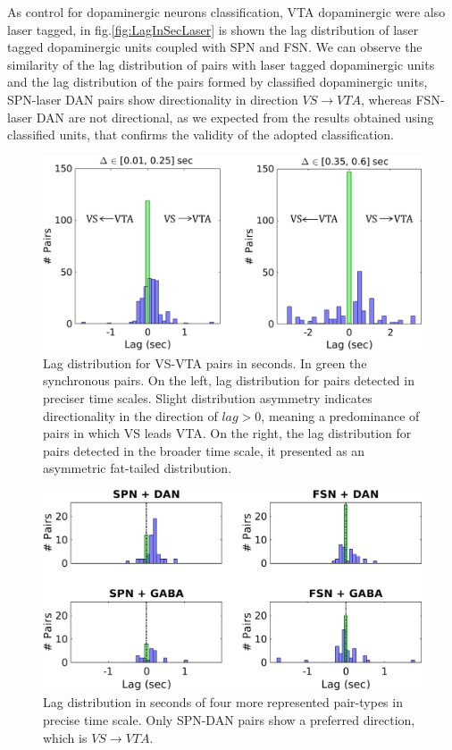 As control for dopaminergic neurons classification, VTA dopaminergic were also laser tagged, in fig.\ref{fig:LagInSecLaser} is shown the lag distribution of laser tagged dopaminergic units coupled with SPN and FSN. We can observe the similarity of the lag distribution of pairs with laser tagged dopaminergic units and the lag distribution of the pairs formed by classified dopaminergic units, SPN-laser DAN pairs show directionality in direction $VS\rightarrow VTA$, whereas FSN-laser DAN are not directional, as we expected from the results obtained using classified units, that confirms the validity of the adopted classification.\\
\begin{figure}[H]
\centering
\includegraphics[scale=0.65]{figures/LagGeneral1.pdf}
\caption{Lag distribution for VS-VTA pairs in seconds. In green the synchronous pairs. On the left, lag distribution for pairs detected in preciser time scales. Slight distribution asymmetry indicates directionality in the direction of $lag > 0$, meaning a predominance of pairs in which VS leads VTA. On the right, the lag distribution for pairs detected in the broader time scale, it presented as an asymmetric fat-tailed distribution.}
\label{fig:LagInSecAll}
\end{figure}
\begin{figure}[H]
\centering
\includegraphics[scale=0.5]{figures/LagSec4Typo3VS.png}
\caption{Lag distribution in seconds of four more represented pair-types in precise time scale. Only SPN-DAN pairs show a preferred direction, which is $VS\rightarrow VTA$.}
\label{fig:LagInSec4typo}
\end{figure}
